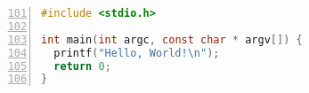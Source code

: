 \begin{lstlisting}[language=C, numbers=left, firstnumber=101, caption={Hello, World}, label=helloworld]
#include <stdio.h>

int main(int argc, const char * argv[]) {
  printf("Hello, World!\n");
  return 0;
}
\end{lstlisting}

